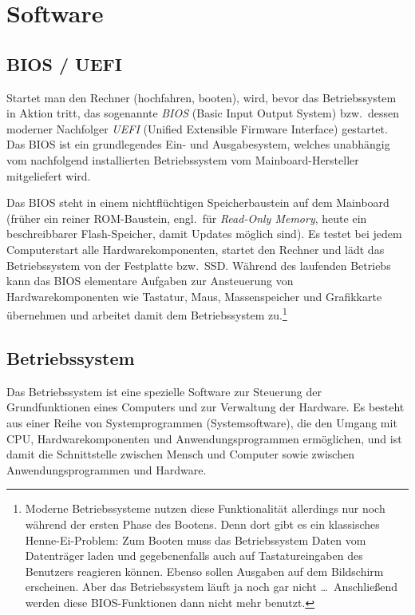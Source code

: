\section{Software}


\subsection{BIOS / UEFI}

Startet man den Rechner (\glqq hochfahren\grqq , booten), wird, bevor das
Betriebssystem in Aktion tritt, das sogenannte \emph{BIOS} (Basic Input Output
System) bzw.\ dessen moderner Nachfolger \emph{UEFI} (Unified Extensible
Firmware Interface) gestartet. Das BIOS ist ein grundlegendes Ein- und
Ausgabesystem, welches unabhängig vom nachfolgend installierten Betriebssystem
vom Mainboard-Hersteller mitgeliefert wird.

Das BIOS steht in einem nichtflüchtigen Speicherbaustein auf dem Mainboard
(früher ein reiner ROM-Baustein, engl.\ für \emph{Read-Only Memory}, heute ein
beschreibbarer Flash-Speicher, damit Updates möglich sind). Es testet bei jedem
Computerstart alle Hardwarekomponenten, startet den Rechner und lädt das
Betriebssystem von der Festplatte bzw.\ SSD. Während des laufenden Betriebs
kann das BIOS elementare Aufgaben zur Ansteuerung von Hardwarekomponenten wie
Tastatur, Maus, Massenspeicher und Grafikkarte übernehmen und arbeitet damit
dem Betriebssystem zu.\footnote{Moderne Betriebssysteme nutzen diese
Funktionalität allerdings nur noch während der ersten Phase des Bootens. Denn
dort gibt es ein klassisches Henne-Ei-Problem: Zum Booten muss das
Betriebssystem Daten vom Datenträger laden und gegebenenfalls auch auf
Tastatureingaben des Benutzers reagieren können. Ebenso sollen Ausgaben auf dem
Bildschirm erscheinen. Aber das Betriebssystem läuft ja noch gar nicht \ldots\
Anschließend werden diese BIOS-Funktionen dann nicht mehr benutzt.}

\subsection{Betriebssystem}

Das Betriebssystem ist eine spezielle Software zur Steuerung der
Grundfunktionen eines Computers und zur Verwaltung der Hardware. Es besteht aus
einer Reihe von Systemprogrammen (Systemsoftware), die den Umgang mit CPU,
Hardwarekomponenten und Anwendungsprogrammen ermöglichen, und ist damit die
Schnittstelle zwischen Mensch und Computer sowie zwischen Anwendungsprogrammen
und Hardware.

